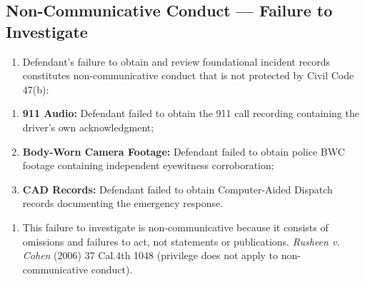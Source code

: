 \subsection{Non-Communicative Conduct --- Failure to Investigate}\label{non-communicative-conduct-failure-to-investigate}

\begin{enumerate}
\def\labelenumi{\arabic{enumi}.}
\setcounter{enumi}{19}
\tightlist
\item
  Defendant's failure to obtain and review foundational incident records constitutes non-communicative conduct that is not protected by Civil Code \textsection{} 47(b):
\end{enumerate}

\begin{enumerate}
\def\labelenumi{(\alph{enumi})}
\item
  \textbf{911 Audio:} Defendant failed to obtain the 911 call recording containing the driver's own acknowledgment;
\item
  \textbf{Body-Worn Camera Footage:} Defendant failed to obtain police BWC footage containing independent eyewitness corroboration;
\item
  \textbf{CAD Records:} Defendant failed to obtain Computer-Aided Dispatch records documenting the emergency response.
\end{enumerate}

\begin{enumerate}
\def\labelenumi{\arabic{enumi}.}
\setcounter{enumi}{20}
\tightlist
\item
  This failure to investigate is non-communicative because it consists of omissions and failures to act, not statements or publications. \emph{Rusheen v. Cohen} (2006) 37 Cal.4th 1048 (privilege does not apply to non-communicative conduct).
\end{enumerate}

